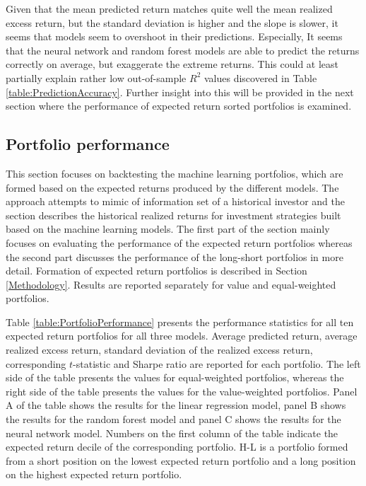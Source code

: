 \documentclass[12pt]{article}
\begin{document}
Given that the mean predicted return matches quite well the mean realized excess return, but the standard deviation is higher and the slope is slower, it seems that models seem to overshoot in their predictions. Especially, It seems that the neural network and random forest models are able to predict the returns correctly on average, but exaggerate the extreme returns. This could at least partially explain rather low out-of-sample $R^2$ values discovered in Table \ref{table:PredictionAccuracy}. Further insight into this will be provided in the next section where the performance of expected return sorted portfolios is examined. \par

\subsection{Portfolio performance}\label{PortfolioPerformance}

This section focuses on backtesting the machine learning portfolios, which are formed based on the expected returns produced by the different models. The approach attempts to mimic of information set of a historical investor and the section describes the historical realized returns for investment strategies built based on the machine learning models. The first part of the section mainly focuses on evaluating the performance of the expected return portfolios whereas the second part discusses the performance of the long-short portfolios in more detail. Formation of expected return portfolios is described in Section \ref{Methodology}. Results are reported separately for value and equal-weighted portfolios. \par

Table \ref{table:PortfolioPerformance} presents the performance statistics for all ten expected return portfolios for all three models. Average predicted return, average realized excess return, standard deviation of the realized excess return, corresponding $t$-statistic and Sharpe ratio are reported for each portfolio. The left side of the table presents the values for equal-weighted portfolios, whereas the right side of the table presents the values for the value-weighted portfolios. Panel A of the table shows the results for the linear regression model, panel B shows the results for the random forest model and panel C shows the results for the neural network model. Numbers on the first column of the table indicate the expected return decile of the corresponding portfolio. H-L is a portfolio formed from a short position on the lowest expected return portfolio and a long position on the highest expected return portfolio. \par
\end{document}
